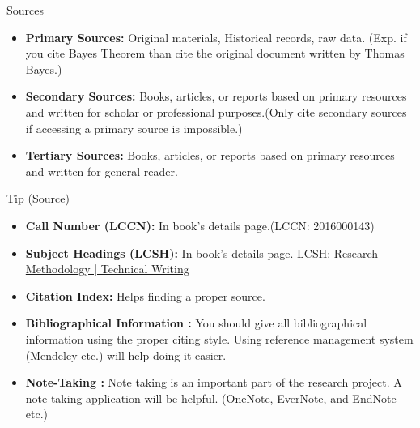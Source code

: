 \documentclass{beamer}
\begin{document}
	\begin{frame}
		\begin{block}{Sources}
		\end{block}
		\begin{itemize}
			 \item \textbf{Primary Sources:} Original materials, Historical records, raw data. (Exp. if you cite Bayes Theorem  than cite the original document written by Thomas Bayes.)
			\onslide<2-> \item \textbf{Secondary Sources:} Books, articles, or reports based on primary resources and written for scholar or professional purposes.(Only cite secondary sources if accessing a primary source is impossible.) 
			\onslide<3-> \item \textbf{Tertiary Sources:} Books, articles, or reports based on primary resources and written for general reader. 
		\end{itemize}
	\end{frame}
	\begin{frame}
		\begin{block}{Tip (Source)}
		\end{block}
		\begin{itemize}
			 \item \textbf{Call Number (LCCN):} In book's details page.(LCCN: 2016000143)
			\onslide<2-> \item \textbf{Subject Headings (LCSH):} In book's details page. \href{http://library.metu.edu.tr/search~S4/?searchtype=d&searcharg=research+methodolgy&searchscope=4&sortdropdown=-&SORT=DZ&extended=0&SUBMIT=Search&searchlimits=&searchorigarg=Xreaerch+methodolgy}{LCSH: Research--Methodology | Technical Writing } 
			\onslide<3-> \item \textbf{Citation Index:} Helps finding a proper source.
			\onslide<4-> \item \textbf{Bibliographical Information :} You should give all bibliographical information using the proper citing style. Using reference management system (Mendeley etc.) will help doing it easier. 
			\onslide<4-> \item \textbf{Note-Taking :} Note taking is an important part of the research project. A note-taking application will be helpful. (OneNote, EverNote, and EndNote etc.)
		\end{itemize}
	\end{frame}
\end{document}
